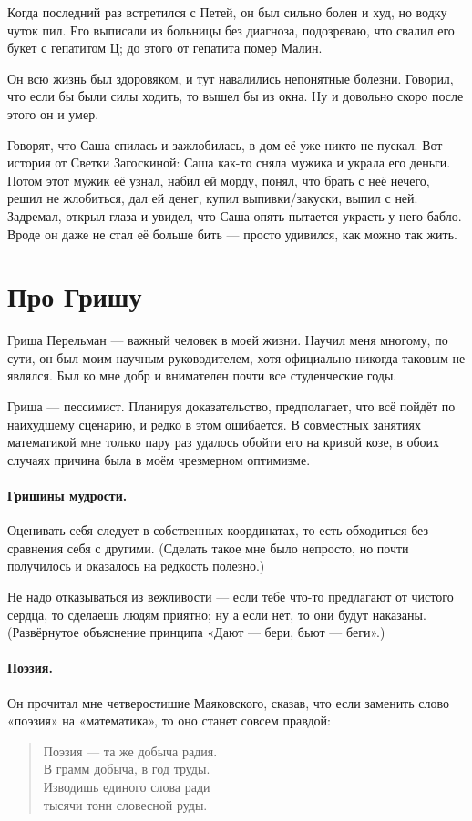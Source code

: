 \documentclass{book}
\begin{document}
Когда последний раз встретился с Петей, он был сильно болен и худ, но водку чуток пил.
Его выписали из больницы без диагноза, подозреваю, что свалил его букет с гепатитом Ц;
до этого от гепатита помер Малин.

Он всю жизнь был здоровяком, и тут навалились непонятные болезни.
Говорил, что если бы были силы ходить, то вышел бы из окна.
Ну и довольно скоро после этого он и умер.

Говорят, что Саша спилась и зажлобилась, в дом её уже никто не пускал.
Вот история от Светки Загоскиной:
Саша как-то сняла мужика и украла его деньги.
Потом этот мужик её узнал, набил ей морду, понял, что брать с неё нечего, решил не жлобиться, дал ей денег, купил выпивки/закуски, выпил с ней.
Задремал, открыл глаза и увидел, что Саша опять пытается украсть у него бабло.
Вроде он даже не стал её больше бить --- просто удивился, как можно так жить.

\section*{Про Гришу}

Гриша Перельман --- важный человек в моей жизни.
Научил меня многому, по сути, он был моим научным руководителем, хотя официально никогда таковым не являлся.
Был ко мне добр и внимателен почти все студенческие годы.

Гриша --- пессимист.
Планируя доказательство, предполагает, что всё пойдёт по наихудшему сценарию, и редко в этом ошибается.
В совместных занятиях математикой мне только пару раз удалось обойти его на кривой козе, в обоих случаях причина была в моём чрезмерном оптимизме.

\paragraph{Гришины мудрости.}
Оценивать себя следует в собственных координатах, то есть обходиться без сравнения себя с другими.
(Сделать такое мне было непросто, но почти получилось и оказалось на редкость полезно.)

Не надо отказываться из вежливости  --- если тебе что-то предлагают от чистого сердца, то сделаешь людям приятно; ну а если нет, то они будут наказаны.
(Развёрнутое объяснение принципа «Дают --- бери, бьют --- беги».)

\paragraph{Поэзия.}
Он прочитал мне четверостишие Маяковского,
сказав, что если заменить слово «поэзия» на «математика», то оно станет совсем правдой: 
\begin{verse}
Поэзия — та же добыча радия.\\
В грамм добыча, в год труды.\\
Изводишь единого слова ради\\
тысячи тонн словесной руды.\\
\end{verse}
\end{document}
